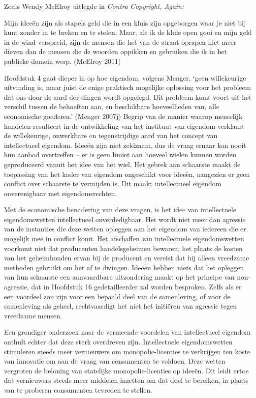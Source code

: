 \documentclass[
  a5paper,
  smalldemyvopaper,11pt,twoside,onecolumn,openright,extrafontsizes,
hidelinks]{memoir}
\begin{document}
Zoals Wendy McElroy uitlegde in \emph{Contra Copyright, Again:}

Mijn ideeën zijn als stapels geld die in een kluis zijn opgeborgen waar
je niet bij kunt zonder in te breken en te stelen. Maar, als ik de kluis
open gooi en mijn geld in de wind verspreid, zijn de mensen die het van
de straat oprapen niet meer dieven dan de mensen die de woorden oppikken
en gebruiken die ik in het publieke domein werp. (McElroy 2011)

Hoofdstuk 4 gaat dieper in op hoe eigendom, volgens Menger, `geen
willekeurige uitvinding is, maar juist de enige praktisch mogelijke
oplossing voor het probleem dat ons door de aard der dingen wordt
opgelegd. Dit probleem komt voort uit het verschil tussen de behoeften
aan, en beschikbare hoeveelheden van, alle economische goederen.'
(Menger 2007j) Begrip van de manier waarop menselijk handelen resulteert
in de ontwikkeling van het instituut van eigendom verklaart de
willekeurige, onwerkbare en tegenstrijdige aard van het concept van
intellectueel eigendom. Ideeën zijn niet zeldzaam, dus de vraag ernaar
kan nooit hun aanbod overtreffen \emph{--} er is geen limiet aan hoeveel
wielen kunnen worden geproduceerd vanuit het idee van het wiel. Het
gebrek aan schaarste maakt de toepassing van het kader van eigendom
ongeschikt voor ideeën, aangezien er geen conflict over schaarste te
vermijden is. Dit maakt intellectueel eigendom onverenigbaar met
eigendomsrechten.

Met de economische benadering van deze vragen, is het idee van
intellectuele eigendomswetten intellectueel onverdedigbaar. Het wordt
niet meer dan agressie van de instanties die deze wetten opleggen aan
het eigendom van iedereen die er mogelijk mee in conflict komt. Het
afschaffen van intellectuele eigendomswetten voorkomt niet dat
producenten handelsgeheimen bewaren; het plaats de kosten van het
geheimhouden ervan bij de producent en vereist dat hij alleen vreedzame
methoden gebruikt om het af te dwingen. Ideeën hebben niets dat het
opleggen van hun schaarste een aanvaardbare uitzondering maakt op het
principe van non-agressie, dat in Hoofdstuk 16 gedetailleerder zal
worden besproken. Zelfs als er een voordeel zou zijn voor een bepaald
deel van de samenleving, of voor de samenleving als geheel,
rechtvaardigt het niet het initiëren van agressie tegen vreedzame
mensen.

Een grondiger onderzoek naar de vermeende voordelen van intellectueel
eigendom onthult echter dat deze sterk overdreven zijn. Intellectuele
eigendomswetten stimuleren steeds meer vernieuwers om
monopolie-licenties te verkrijgen ten koste van innovatie om aan de
vraag van consumenten te voldoen. Deze wetten vergroten de beloning van
statelijke monopolie-licenties op ideeën. Dit leidt ertoe dat
vernieuwers steeds meer middelen inzetten om dat doel te bereiken, in
plaats van te proberen consumenten tevreden te stellen.
\end{document}
